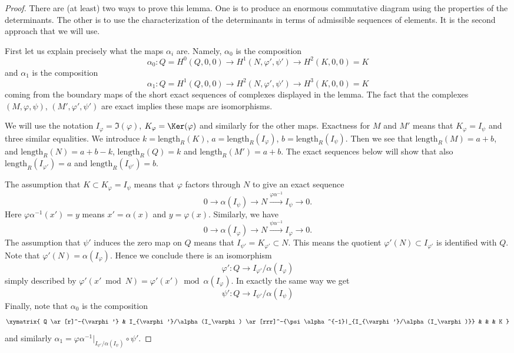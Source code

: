 \begin{proof}
There are (at least) two ways to prove this lemma. One is to produce an
enormous commutative diagram using the properties of the determinants.
The other is to use the characterization of the determinants in terms
of admissible sequences of elements. It is the second approach that we
will use.

\medskip\noindent
First let us explain precisely what the maps $\alpha_i$ are.
Namely, $\alpha_0$ is the composition
$$
\alpha_0 : Q = H^0(Q, 0, 0) \to H^1(N, \varphi', \psi') \to H^2(K, 0, 0) = K
$$
and $\alpha_1$ is the composition
$$
\alpha_1 : Q = H^1(Q, 0, 0) \to H^2(N, \varphi', \psi') \to H^3(K, 0, 0) = K
$$
coming from the boundary maps of the short exact sequences of complexes
displayed in the lemma. The fact that the
complexes $(M, \varphi, \psi)$, $(M', \varphi', \psi')$ are exact
implies these maps are isomorphisms.

\medskip\noindent
We will use the notation $I_\varphi = \Im(\varphi)$,
$K_\varphi = \Ker(\varphi)$ and similarly for the other maps.
Exactness for $M$ and $M'$
means that $K_\varphi = I_\psi$ and three similar equalities.
We introduce $k = \text{length}_R(K)$, $a = \text{length}_R(I_\varphi)$,
$b = \text{length}_R(I_\psi)$. Then we see that $\text{length}_R(M) = a + b$,
and $\text{length}_R(N) = a + b - k$, $\text{length}_R(Q) = k$
and $\text{length}_R(M') = a + b$. The exact sequences below will show
that also $\text{length}_R(I_{\varphi'}) = a$ and
$\text{length}_R(I_{\psi'}) = b$.

\medskip\noindent
The assumption that $K \subset K_\varphi = I_\psi$ means that
$\varphi$ factors through $N$ to give an exact sequence
$$
0 \to \alpha(I_\psi) \to N \xrightarrow{\varphi\alpha^{-1}} I_\psi \to 0.
$$
Here $\varphi\alpha^{-1}(x') = y$ means $x' = \alpha(x)$ and $y = \varphi(x)$.
Similarly, we have
$$
0 \to \alpha(I_\varphi) \to N \xrightarrow{\psi\alpha^{-1}} I_\varphi \to 0.
$$
The assumption that $\psi'$ induces the zero map on
$Q$ means that $I_{\psi'} = K_{\varphi'} \subset N$.
This means the quotient $\varphi'(N) \subset I_{\varphi'}$
is identified with $Q$. Note that $\varphi'(N) = \alpha(I_\varphi)$.
Hence we conclude there is an isomorphism
$$
\varphi' : Q \to I_{\varphi'}/\alpha(I_\varphi)
$$
simply described by
$\varphi'(x' \bmod N) = \varphi'(x') \bmod \alpha(I_\varphi)$.
In exactly the same way we get
$$
\psi' : Q \to I_{\psi'}/\alpha(I_\psi)
$$
Finally, note that $\alpha_0$ is the composition
$$
\xymatrix{
Q \ar[r]^-{\varphi'} &
I_{\varphi'}/\alpha(I_\varphi)
\ar[rrr]^-{\psi\alpha^{-1}|_{I_{\varphi'}/\alpha(I_\varphi)}} & & &
K
}
$$
and similarly
$\alpha_1 = \varphi\alpha^{-1}|_{I_{\psi'}/\alpha(I_\psi)} \circ \psi'$.


\end{proof}
